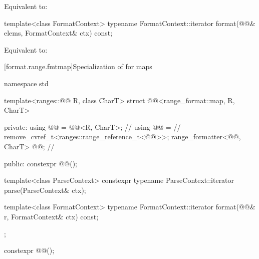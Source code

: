 \begin{itemdescr}
\pnum
\effects
Equivalent to: 
\end{itemdescr}

%
\begin{itemdecl}
template<class FormatContext>
  typename FormatContext::iterator
    format(@@& elems, FormatContext& ctx) const;
\end{itemdecl}

\begin{itemdescr}
\pnum
\effects
Equivalent to: 
\end{itemdescr}

[format.range.fmtmap]{Specialization of  for maps}

%
\begin{codeblock}
namespace std {
  template<ranges::@@ R, class CharT>
  struct @@<range_format::map, R, CharT> {
  private:
    using @@ = @@<R, CharT>;                  // \expos
    using @@ =                                                // \expos
      remove_cvref_t<ranges::range_reference_t<@@>>;
    range_formatter<@@, CharT> @@;                   // \expos

  public:
    constexpr @@();

    template<class ParseContext>
      constexpr typename ParseContext::iterator
        parse(ParseContext& ctx);

    template<class FormatContext>
      typename FormatContext::iterator
        format(@@& r, FormatContext& ctx) const;
  };
}
\end{codeblock}

%
\begin{itemdecl}
constexpr @@();
\end{itemdecl}

